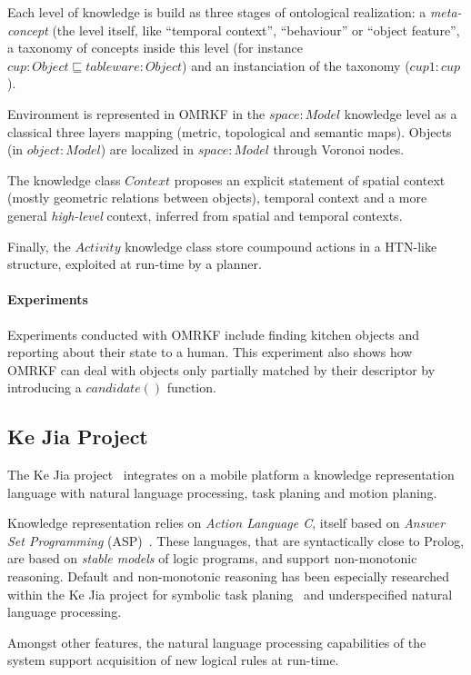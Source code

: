\documentclass[a4paper, twocolumn]{article}
\begin{document}
Each level of knowledge is build as three stages of ontological realization: a
\emph{meta-concept} (the level itself, like ``temporal context'', ``behaviour''
or ``object feature'', a taxonomy of concepts inside this level (for instance
$cup : Object \sqsubseteq tableware : Object$) and an instanciation of the
taxonomy ($cup1 : cup$).

Environment is represented in OMRKF in the $space : Model$ knowledge level as a
classical three layers mapping (metric, topological and semantic maps). Objects
(in $object : Model$) are localized in $space : Model$ through Voronoi nodes.

The knowledge class $Context$ proposes an explicit statement of spatial context
(mostly geometric relations between objects), temporal context and a more
general \emph{high-level} context, inferred from spatial and temporal contexts.

Finally, the $Activity$ knowledge class store coumpound actions in a HTN-like
structure, exploited at run-time by a planner.

\paragraph{Experiments} Experiments conducted with OMRKF include finding
kitchen objects and reporting about their state to a human.  This experiment
also shows how OMRKF can deal with objects only partially matched by their
descriptor by introducing a $candidate()$ function.

\subsection{Ke Jia Project}
\label{sect|kejia}

The Ke Jia project~\cite{Chen2010} integrates on a mobile platform a knowledge
representation language with natural language processing, task planing and
motion planing.

Knowledge representation relies on \emph{Action Language C}, itself based on
\emph{Answer Set Programming} (ASP)~\cite{Gelfond2008}. These languages, that
are syntactically close to Prolog, are based on \emph{stable models} of logic
programs, and support non-monotonic reasoning. Default and non-monotonic
reasoning has been especially researched within the Ke Jia project for symbolic
task planing~\cite{Ji2011} and underspecified natural language processing.

Amongst other features, the natural language processing capabilities of the
system support acquisition of new logical rules at run-time.
\end{document}
